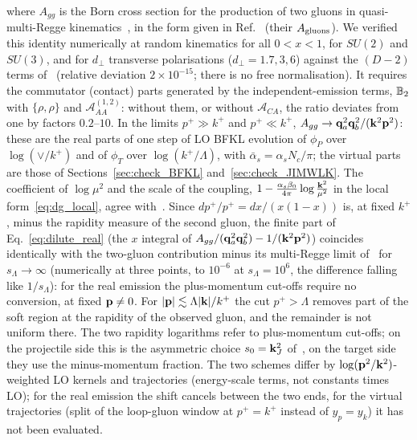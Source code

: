 where $A_{gg}$ is the Born cross section for the production of two gluons in quasi-multi-Regge kinematics~\cite{Fadin:1998py}, in the form given in Ref.~\cite{Bartels:2006hg} (their $A_{\rm gluons}$). We verified this identity numerically at random kinematics for all $0<x<1$, for $SU(2)$ and $SU(3)$, and for $d_\perp$ transverse polarisations ($d_\perp=1.7,3,6$) against the $(D-2)$ terms of~\cite{Bartels:2006hg} (relative deviation $2\times10^{-15}$; there is no free normalisation). It requires the commutator (contact) parts generated by the independent-emission terms, $\mathbb{B}_2$ with $\{\rho,\rho\}$ and $\mathcal A^{(1,2)}_{AA}$: without them, or without $\mathcal A_{CA}$, the ratio deviates from one by factors $0.2$--$10$. In the limits $p^+\gg k^+$ and $p^+\ll k^+$, $A_{gg}\to\mathbf{q}_a^2\mathbf{q}_b^2/(\mathbf{k}^2\mathbf{p}^2)$: these are the real parts of one step of LO BFKL evolution of $\phi_P$ over $\log(\vee/k^+)$ and of $\phi_T$ over $\log(k^+/\Lambda)$, with $\bar\alpha_s=\alpha_sN_c/\pi$; the virtual parts are those of Sections~\ref{sec:check_BFKL} and~\ref{sec:check_JIMWLK}. The coefficient of $\log\mu^2$ and the scale of the coupling, $1-\frac{\alpha_s\beta_0}{4\pi}\log\frac{\mathbf{k}^2}{\mu^2}$ in the local form~\eqref{eq:dg_local}, agree with~\cite{Fadin:1998py,Bartels:2006hg}. Since $dp^+/p^+=dx/(x(1-x))$ is, at fixed $k^+$, minus the rapidity measure of the second gluon, the finite part of Eq.~\eqref{eq:dilute_real} (the $x$ integral of $A_{gg}/(\mathbf{q}_a^2\mathbf{q}_b^2)-1/(\mathbf{k}^2\mathbf{p}^2)$) coincides identically with the two-gluon contribution minus its multi-Regge limit of~\cite{Bartels:2006hg} for $s_\Lambda\to\infty$ (numerically at three points, to $10^{-6}$ at $s_\Lambda=10^6$, the difference falling like $1/s_\Lambda$): for the real emission the plus-momentum cut-offs require no conversion, at fixed $\mathbf{p}\neq0$. For $|\mathbf{p}|\lesssim\Lambda|\mathbf{k}|/k^+$ the cut $p^+>\Lambda$ removes part of the soft region at the rapidity of the observed gluon, and the remainder is not uniform there. The two rapidity logarithms refer to plus-momentum cut-offs; on the projectile side this is the asymmetric choice $s_0=\mathbf{k}_J^2$ of~\cite{Bartels:2006hg}, on the target side they use the minus-momentum fraction. The two schemes differ by $\log(\mathbf{p}^2/\mathbf{k}^2)$-weighted LO kernels and trajectories (energy-scale terms, not constants times LO); for the real emission the shift cancels between the two ends, for the virtual trajectories (split of the loop-gluon window at $p^+=k^+$ instead of $y_p=y_k$) it has not been evaluated.

